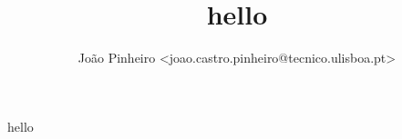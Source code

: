\documentclass[portuguese, a4paper, titlepage]{article}
\title{hello}
\author{João Pinheiro <joao.castro.pinheiro@tecnico.ulisboa.pt>}
\begin{document}
	\maketitle
	hello
\end{document}
